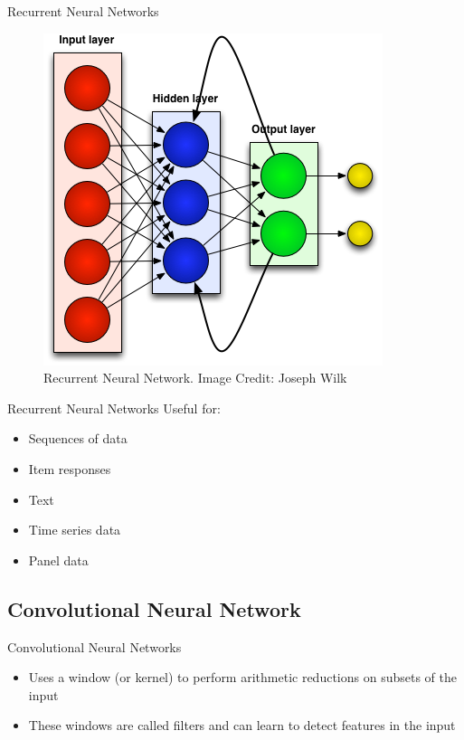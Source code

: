 \documentclass{beamer}
\begin{document}
            \begin{frame}{Recurrent Neural Networks}
                \begin{figure}
                    \centering
                    \includegraphics[scale=0.45]{nn-recurrent.png}
                    \caption{Recurrent Neural Network. Image Credit: Joseph Wilk}
                \end{figure}           
            \end{frame}
            
            \begin{frame}{Recurrent Neural Networks}
                Useful for:
                \begin{itemize}
                    \item<2-> Sequences of data
                    \item<3-> Item responses
                    \item<4-> Text
                    \item<5-> Time series data
                    \item<6-> Panel data
                \end{itemize}
            \end{frame}
            
        \subsection{Convolutional Neural Network}   
            
            \begin{frame}{Convolutional Neural Networks}
                \begin{itemize}
                    \item<2-> Uses a window (or kernel) to perform arithmetic reductions on subsets of the input
                    \item<3-> These windows are called filters and can learn to detect features in the input
                \end{itemize}
            \end{frame}
                    
\end{document}
